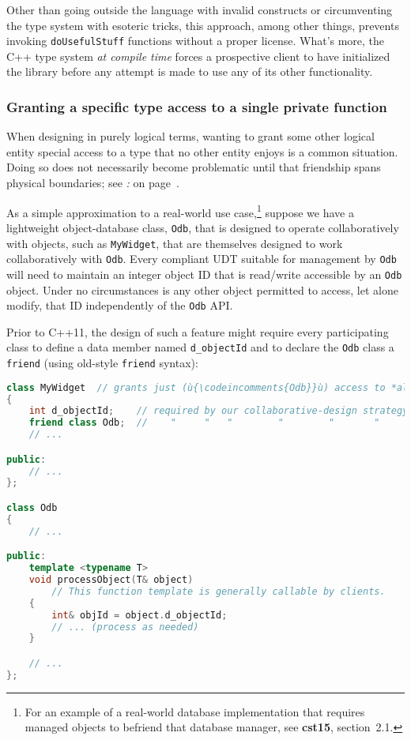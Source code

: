 \noindent Other than going outside the language with invalid constructs or circumventing the
type system with esoteric tricks, this approach, among other things,
prevents invoking \texttt{doUsefulStuff} functions without a proper
license. What's more, the C++ type system \emph{at compile time} forces
a prospective client to have initialized the library before any attempt
is made to use any of its other functionality.

\subsubsection[Granting a specific type access to a single {\tt private} function]{Granting a specific type access to a single {\SubsubsecCode private} function}\label{granting-a-specific-type-access-to-a-single-private-function}

When designing in purely logical terms, wanting to grant some other
logical entity special access to a type that no other entity enjoys is a
common situation. Doing so does not necessarily become problematic until
that friendship spans physical boundaries; see \textit{: } on page~\pageref{long-distance-friendship}.

As a simple approximation to a real-world use
case,\footnote{For an example of a real-world database
implementation that requires managed objects to befriend that database
manager, see \textbf{cst15}, section~2.1.} suppose we have a lightweight object-database class, \texttt{Odb}, that is designed to operate
collaboratively with objects, such as \texttt{MyWidget}, that are
themselves designed to work collaboratively with \texttt{Odb}. Every compliant UDT
suitable for management by \texttt{Odb} will need to maintain an integer
object ID that is read/write accessible by an \texttt{Odb} object. Under
no circumstances is any other object permitted to access, let alone
modify, that ID independently of the \texttt{Odb} API.

Prior to C++11, the design of such a feature might require every
participating class to define a data member named \texttt{d\_objectId}
and to declare the \texttt{Odb} class a \texttt{friend} (using old-style
\texttt{friend} syntax):

\begin{lstlisting}[language=C++]
class MyWidget  // grants just (ù{\codeincomments{Odb}}ù) access to *all* of its private data
{
    int d_objectId;    // required by our collaborative-design strategy
    friend class Odb;  //    "     "   "        "        "       "
    // ...

public:
    // ...
};

class Odb
{
    // ...

public:
    template <typename T>
    void processObject(T& object)
        // This function template is generally callable by clients.
    {
        int& objId = object.d_objectId;
        // ... (process as needed)
    }

    // ...
};
\end{lstlisting}
    
